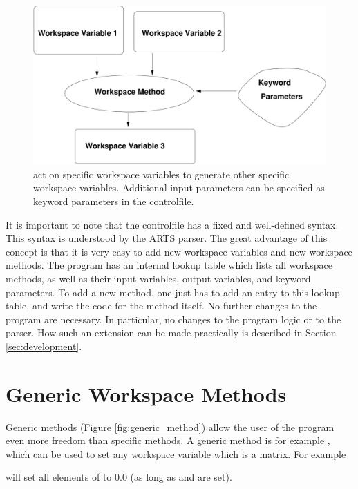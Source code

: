 \begin{figure}
  \begin{center}
    \includegraphics[width=\hsize,draft=false]{method}
    \caption{ act on specific workspace variables to
        generate other specific workspace variables. Additional input
        parameters can be specified as keyword parameters in the
        controlfile.}
    \label{fig:method}
  \end{center}
\end{figure}

It is important to note that the controlfile has a fixed and
well-defined syntax. This syntax is understood by the ARTS parser.
The great advantage of this concept is that it is very easy to add
new workspace variables and new workspace methods. The program has
an internal lookup table which lists all workspace methods, as well
as their input variables, output variables, and keyword
parameters. To add a new method, one just has to add an entry to
this lookup table, and write the code for the method itself. No
further changes to the program are necessary. In particular, no
changes to the program logic or to the parser. How such an extension
can be made practically is described in Section \ref{sec:development}.


\section{Generic Workspace Methods}
\label{sec:concept:generic}

Generic methods (Figure \ref{fig:generic_method}) allow the user of
the program even more freedom than specific methods. A generic method
is for example , which can be used to set any
workspace variable which is a matrix. For example
\begin{quote}
\end{quote}
will set all elements of  to 0.0 (as long as
 and  are set).

